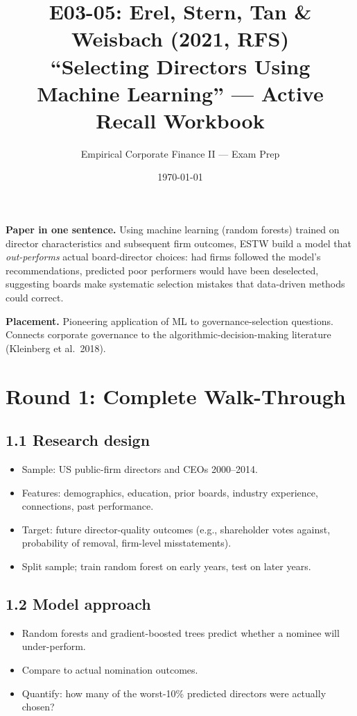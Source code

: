 \documentclass[11pt]{article}
\title{E03-05: Erel, Stern, Tan \& Weisbach (2021, RFS) \\
\large ``Selecting Directors Using Machine Learning'' --- Active Recall Workbook}
\author{Empirical Corporate Finance II --- Exam Prep}
\date{\today}
\begin{document}
\maketitle

\begin{keybox}
\textbf{Paper in one sentence.} Using machine learning (random forests) trained on director characteristics and subsequent firm outcomes, ESTW build a model that \emph{out-performs} actual board-director choices: had firms followed the model's recommendations, predicted poor performers would have been deselected, suggesting boards make systematic selection mistakes that data-driven methods could correct.

\textbf{Placement.} Pioneering application of ML to governance-selection questions. Connects corporate governance to the algorithmic-decision-making literature (Kleinberg et al.\ 2018).
\end{keybox}

\section*{Round 1: Complete Walk-Through}

\subsection*{1.1 Research design}
\begin{itemize}
\item Sample: US public-firm directors and CEOs 2000--2014.
\item Features: demographics, education, prior boards, industry experience, connections, past performance.
\item Target: future director-quality outcomes (e.g., shareholder votes against, probability of removal, firm-level misstatements).
\item Split sample; train random forest on early years, test on later years.
\end{itemize}

\subsection*{1.2 Model approach}
\begin{itemize}
\item Random forests and gradient-boosted trees predict whether a nominee will under-perform.
\item Compare to actual nomination outcomes.
\item Quantify: how many of the worst-10\% predicted directors were actually chosen?
\end{itemize}
\end{document}
